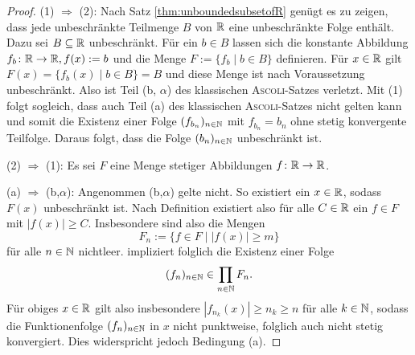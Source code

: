 \begin{proof}
  (1) $\Rightarrow$ (2):
  Nach Satz \ref{thm:unboundedsubsetofR} genügt es zu zeigen, dass jede unbeschränkte Teilmenge $B$ von $\mathbb{R}$ eine unbeschränkte Folge enthält.
  Dazu sei $B \subseteq \mathbb{R}$ unbeschränkt.
  Für ein $b \in B$ lassen sich die konstante Abbildung $f_b \colon \mathbb{R} \to \mathbb{R}, f(x):= b$ und die Menge $F := \{f_b \mid b \in B\}$ definieren.
  Für $x \in \mathbb{R}$ gilt $F(x) = \{f_b(x) \mid b \in B\} = B$ und diese Menge ist nach Voraussetzung unbeschränkt.
  Also ist Teil (b, $\alpha$) des klassischen \textsc{Ascoli}\hyp{}Satzes verletzt.
  Mit (1) folgt sogleich, dass auch Teil (a) des klassischen \textsc{Ascoli}\hyp{}Satzes nicht gelten kann und somit die Existenz einer Folge $(f_{b_n})_{n \in \mathbb{N}}$ mit $f_{b_n} = b_n$ ohne stetig konvergente Teilfolge.
  Daraus folgt, dass die Folge $(b_n)_{n \in \mathbb{N}}$ unbeschränkt ist.

  (2) $\Rightarrow$ (1):
  Es sei $F$ eine Menge stetiger Abbildungen $f \colon \mathbb{R} \to \mathbb{R}$.

  (a) $\Rightarrow$ (b,$\alpha$):
  Angenommen (b,$\alpha$) gelte nicht. So existiert ein $x \in \mathbb{R}$, sodass $F(x)$ unbeschränkt ist.
  Nach Definition existiert also für alle $C \in \mathbb{R}$ ein $f \in F$ mit $|f(x)| \geq C$.
  Insbesondere sind also die Mengen 
  \begin{displaymath}
    F_n := \{ f \in F \mid |f(x)| \geq m \}
  \end{displaymath}
  für alle $n \in \mathbb{N}$ nichtleer.
  \CCR impliziert folglich die Existenz einer Folge 
  \begin{displaymath}
    (f_n)_{n \in \mathbb{N}} \in \prod_{n \in \mathbb{N}} F_n.
  \end{displaymath}
  Für obiges $x \in \mathbb{R}$ gilt also insbesondere $|f_{n_k}(x)| \geq n_k \geq n$ für alle $k \in \mathbb{N}$, sodass die Funktionenfolge $(f_n)_{n \in \mathbb{N}}$ in $x$ nicht punktweise, folglich auch nicht stetig konvergiert.
  Dies widerspricht jedoch Bedingung (a).


\end{proof}
